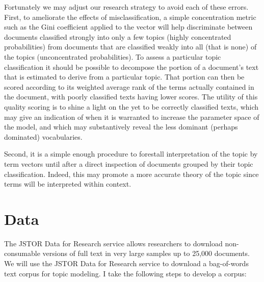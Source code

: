 \documentclass[]{book}
\theoremstyle{definition}
\theoremstyle{definition}
\theoremstyle{definition}
\theoremstyle{remark}
\begin{document}
Fortunately we may adjust our research strategy to avoid each of these
errors. First, to ameliorate the effects of misclassification, a simple
concentration metric such as the Gini coefficient applied to the vector
will help discriminate between documents classified strongly into only a
few topics (highly concentrated probabilities) from documents that are
classified weakly into all (that is none) of the topics (unconcentrated
probabilities). To assess a particular topic classification it should be
possible to decompose the portion of a document's text that is estimated
to derive from a particular topic. That portion can then be scored
according to its weighted average rank of the terms actually contained
in the document, with poorly classified texts having lower scores. The
utility of this quality scoring is to shine a light on the yet to be
correctly classified texts, which may give an indication of when it is
warranted to increase the parameter space of the model, and which may
substantively reveal the less dominant (perhaps dominated) vocabularies.

Second, it is a simple enough procedure to forestall interpretation of
the topic by term vectors until after a direct inspection of documents
grouped by their topic classification. Indeed, this may promote a more
accurate theory of the topic since terms will be interpreted within
context.

\hypertarget{data}{%
\section{Data}\label{data}}

The JSTOR Data for Research service allows researchers to download
non-consumable versions of full text in very large samples up to 25,000
documents. We will use the JSTOR Data for Research service to download a
bag-of-words text corpus for topic modeling. I take the following steps
to develop a corpus:
\end{document}
